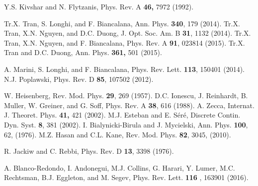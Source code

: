 \documentclass[twocolumn,aps, prl,showpacs]{revtex4}
\begin{document}
\begin{thebibliography}{99}
 Y.S. Kivshar and N. Flytzanis, Phys. Rev. A {\bf 46,} 7972 (1992).


 Tr.X. Tran, S. Longhi, and F. Biancalana, Ann. Phys. {\bf 340}, 179 (2014).
 Tr.X. Tran, X.N. Nguyen, and D.C. Duong, J. Opt. Soc. Am. B {\bf 31}, 1132 (2014).
 Tr.X. Tran, X.N. Nguyen, and F. Biancalana, Phys. Rev. A {\bf 91}, 023814 (2015).
 Tr.X. Tran and D.C. Duong, Ann. Phys. {\bf 361,} 501 (2015).

 A. Marini, S. Longhi, and F. Biancalana, Phys. Rev. Lett. {\bf 113}, 150401 (2014).
 N.J. Poplawski, Phys. Rev. D {\bf 85}, 107502 (2012).

 W. Heisenberg, Rev. Mod. Phys. {\bf 29}, 269 (1957).
 D.C. Ionescu, J. Reinhardt, B. Muller, W. Greiner, and G. Soff, Phys. Rev. A {\bf 38}, 616 (1988).
 A. Zecca, Internat. J. Theoret. Phys. {\bf 41,} 421 (2002).
 M.J. Esteban and E. S\'{e}r\'{e}, Discrete Contin. Dyn. Syst. {\bf 8}, 381 (2002).
 I. Bialynicki-Birula and J.  Mycielski, Ann. Phys. {\bf 100}, 62, (1976).
 M.Z. Hasan and C.L. Kane, Rev. Mod. Phys. {\bf 82}, 3045, (2010).

 R. Jackiw and C. Rebbi, Phys. Rev. D {\bf 13}, 3398 (1976).

 A. Blanco-Redondo, I. Andonegui, M.J. Collins, G. Harari, Y. Lumer, M.C. Rechtsman, B.J. Eggleton, and M. Segev, Phys. Rev. Lett. {\bf 116} , 163901 (2016).

\end{thebibliography}%
\end{document}
